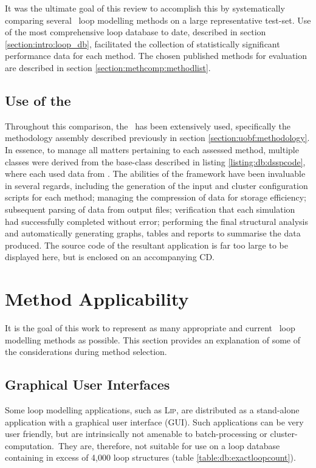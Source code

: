 It was the ultimate goal of this review to accomplish this by systematically comparing several \abinitio\ loop modelling methods on a large representative test-set. Use of the most comprehensive loop database to date, described in section \ref{section:intro:loop_db}, facilitated the collection of statistically significant performance data for each method. The chosen published methods for evaluation are described in section \ref{section:methcomp:methodlist}.  




\subsection{Use of the \uobf}

Throughout this comparison, the \uobf\ has been extensively used, specifically the methodology assembly described previously in section \ref{section:uobf:methodology}. In essence, to manage all matters pertaining to each assessed method, multiple classes were derived from the base-class described in listing \ref{listing:db:dsspcode}, where each used data from \thothloopdb. The abilities of the framework have been invaluable in several regards, including the generation of the input and cluster configuration scripts for each method; managing the compression of data for storage efficiency; subsequent parsing of data from output files; verification that each simulation had successfully completed without error; performing the final structural analysis and automatically generating graphs, tables and reports to summarise the data produced.
The source code of the resultant application is far too large to be displayed here, but is enclosed on an accompanying CD.

 
\section{Method Applicability}
\label{section:methcomp:applicability}

It is the goal of this work to represent as many appropriate and current \abinitio\ loop modelling
methods as possible. This section provides an explanation of some of the considerations during method selection.



\subsection{Graphical User Interfaces}

Some loop modelling applications, such as \textsc{Lip}\cite{METHOD:LIP}, are distributed as a stand-alone application with a graphical user interface (GUI). Such applications can be very user friendly, but are intrinsically not amenable to batch-processing or cluster-computation.\ They are, therefore, not suitable for use
on a loop database containing in excess of 4,000 loop structures (table \ref{table:db:exactloopcount}).



